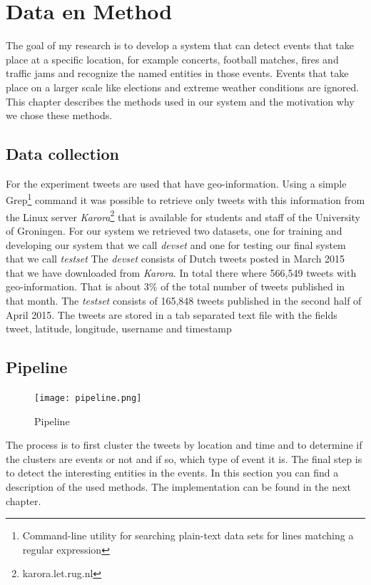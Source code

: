 \documentclass[
10pt, %
a4paper, %
oneside, %
headinclude,footinclude, %
BCOR5mm, %
]{scrartcl}
\begin{document}
\newpage
\section{Data en Method}
The goal of my research is to develop a system that can detect events that take place at a specific location, for example concerts, football matches, fires and traffic jams and recognize the named entities in those events. Events that take place on a larger scale like elections and extreme weather conditions are ignored. This chapter describes the methods used in our system and the motivation why we chose these methods.

\subsection{Data collection}
For the experiment tweets are used that have geo-information. Using a simple Grep\footnote{Command-line utility for searching plain-text data sets for lines matching a regular expression } command it was possible to retrieve only tweets with this information from the Linux server \textit{Karora}\footnote{karora.let.rug.nl} that is available for students and staff of the University of Groningen. For our system we retrieved two datasets, one for training and developing our system that we call \textit{devset} and one for testing our final system that we call \textit{testset}
The \textit{devset} consists of Dutch tweets posted in March 2015 that we have downloaded from \textit{Karora}. In total there where 566,549 tweets with geo-information. That is about 3\% of the total number of tweets published in that month. The \textit{testset} consists of 165,848 tweets published in the second half of April 2015. The tweets are stored in a tab separated text file with the fields tweet, latitude, longitude, username and timestamp


\subsection{Pipeline}
\begin{figure}[htbp] %
   \centering
   \texttt{[image: pipeline.png]} 
   \caption{Pipeline}
   \label{fig:example}
\end{figure}
\noindent The process is to first cluster the tweets by location and time and  to determine if the clusters are events or not and if so, which type of event it is. The final step is to detect the interesting entities in the events. In this section you can find a description of the used methods. The implementation can be found in the next chapter.
\newpage
\end{document}
